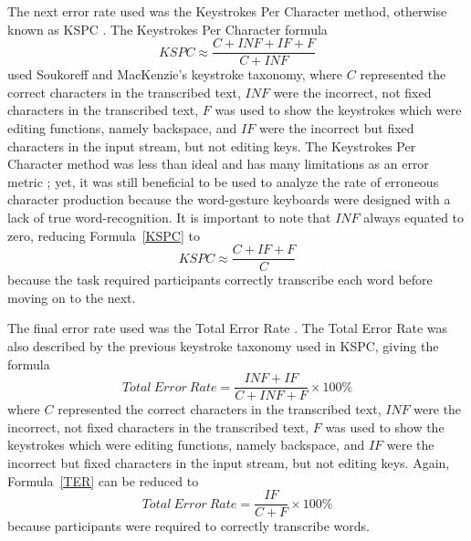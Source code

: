 The next error rate used was the Keystrokes Per Character method, otherwise known as KSPC \cite{ref_error_rates}. The Keystrokes Per Character formula
\begin{equation} \label{KSPC}
KSPC \approx \frac{C + INF + IF + F}{C + INF}
\end{equation}
used Soukoreff and MacKenzie's keystroke taxonomy, where $C$ represented the correct characters in the transcribed text, $INF$ were the incorrect, not fixed characters in the transcribed text, $F$ was used to show the keystrokes which were editing functions, namely backspace, and $IF$ were the incorrect but fixed characters in the input stream, but not editing keys. The Keystrokes Per Character method was less than ideal and has many limitations as an error metric \cite{ref_error_rates}; yet, it was still beneficial to be used to analyze the rate of erroneous character production because the word-gesture keyboards were designed with a lack of true word-recognition. It is important to note that $INF$ always equated to zero, reducing Formula~\ref{KSPC} to
\begin{equation} \label{KSPC_simple}
KSPC \approx \frac{C + IF + F}{C}
\end{equation}
because the task required participants correctly transcribe each word before moving on to the next.

The final error rate used was the Total Error Rate \cite{ref_error_rates}. The Total Error Rate was also described by the previous keystroke taxonomy used in KSPC, giving the formula
\begin{equation} \label{TER}{
Total\ Error\ Rate = \frac{INF + IF}{C + INF + F} \times 100\%
}
\end{equation}
where $C$ represented the correct characters in the transcribed text, $INF$ were the incorrect, not fixed characters in the transcribed text, $F$ was used to show the keystrokes which were editing functions, namely backspace, and $IF$ were the incorrect but fixed characters in the input stream, but not editing keys. Again, Formula~\ref{TER} can be reduced to
\begin{equation} \label{TER_simple}
Total\ Error\ Rate = \frac{IF}{C + F} \times 100\%
\end{equation}
because participants were required to correctly transcribe words.

